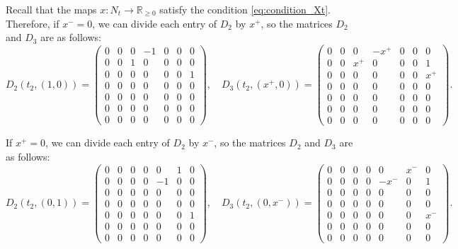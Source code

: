 \documentclass{article}
\theoremstyle{definition}
\newcommand{\R}{\mathbb{R}}
\begin{document}
\begin{itemize}
    Recall that the maps $x\colon N_t\to\R_{\geq0}$ satisfy the condition \eqref{eq:condition_Xt}. Therefore, if $x^-=0$, we can divide each entry of $D_2$ by $x^+$, so the matrices $D_2$ and $D_3$ are as follows: \begin{equation}\label{8d_iso_neutral_t2_D23_I}
    D_2(t_2,(1,0))=\left(\begin{smallmatrix}
        0 & 0 & 0 & -1 & 0 & 0 & 0 \\
        0 & 0 & 1 & 0 & 0 & 0 & 0 \\
        0 & 0 & 0 & 0 & 0 & 0 & 1 \\
        0 & 0 & 0 & 0 & 0 & 0 & 0 \\
        0 & 0 & 0 & 0 & 0 & 0 & 0 \\
        0 & 0 & 0 & 0 & 0 & 0 & 0 \\
        0 & 0 & 0 & 0 & 0 & 0 & 0
    \end{smallmatrix}\right),\quad D_3(t_2,(x^+,0))=\left(\begin{smallmatrix}
        0 & 0 & 0 & -x^+ & 0 & 0 & 0 \\
        0 & 0 & x^+ & 0 & 0 & 0 & 1 \\
        0 & 0 & 0 & 0 & 0 & 0 & x^+ \\
        0 & 0 & 0 & 0 & 0 & 0 & 0 \\
        0 & 0 & 0 & 0 & 0 & 0 & 0 \\
        0 & 0 & 0 & 0 & 0 & 0 & 0 \\
        0 & 0 & 0 & 0 & 0 & 0 & 0
    \end{smallmatrix}\right).\end{equation}

    If $x^+=0$, we can divide each entry of $D_2$ by $x^-$, so the matrices $D_2$ and $D_3$ are as follows: \begin{equation}\label{8d_iso_neutral_t2_D23_II}
    D_2(t_2,(0,1))=\left(\begin{smallmatrix}
        0 & 0 & 0 & 0 & 0 & 1 & 0 \\
        0 & 0 & 0 & 0 & -1 & 0 & 0 \\
        0 & 0 & 0 & 0 & 0 & 0 & 0 \\
        0 & 0 & 0 & 0 & 0 & 0 & 0 \\
        0 & 0 & 0 & 0 & 0 & 0 & 1 \\
        0 & 0 & 0 & 0 & 0 & 0 & 0 \\
        0 & 0 & 0 & 0 & 0 & 0 & 0
    \end{smallmatrix}\right),\quad D_3(t_2,(0,x^-))=\left(\begin{smallmatrix}
        0 & 0 & 0 & 0 & 0 & x^- & 0 \\
        0 & 0 & 0 & 0 & -x^- & 0 & 1 \\
        0 & 0 & 0 & 0 & 0 & 0 & 0 \\
        0 & 0 & 0 & 0 & 0 & 0 & 0 \\
        0 & 0 & 0 & 0 & 0 & 0 & x^- \\
        0 & 0 & 0 & 0 & 0 & 0 & 0 \\
        0 & 0 & 0 & 0 & 0 & 0 & 0
    \end{smallmatrix}\right).\end{equation}


\end{itemize}
\end{document}
